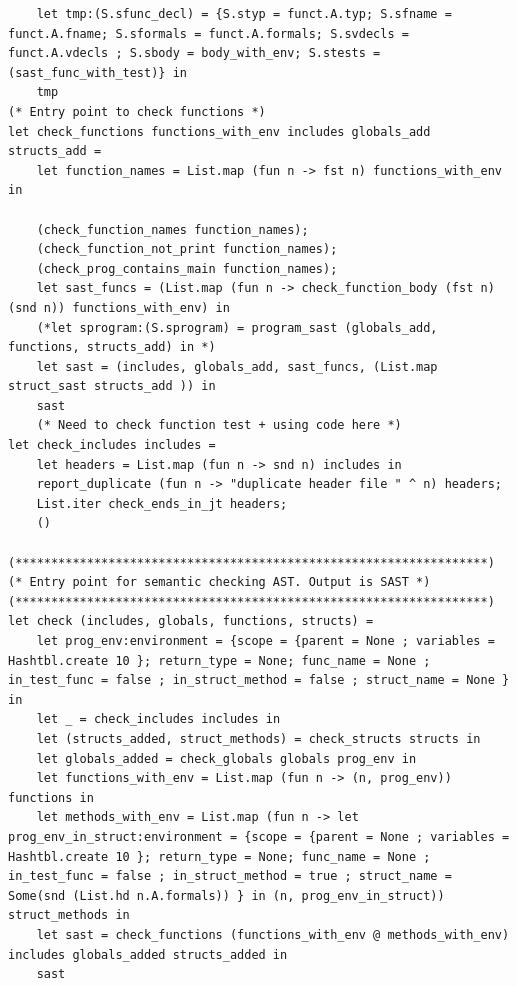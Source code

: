\documentclass{article}
\begin{document}
\begin{lstlisting}
	let tmp:(S.sfunc_decl) = {S.styp = funct.A.typ; S.sfname = funct.A.fname; S.sformals = funct.A.formals; S.svdecls = funct.A.vdecls ; S.sbody = body_with_env; S.stests = (sast_func_with_test)} in
	tmp
(* Entry point to check functions *)
let check_functions functions_with_env includes globals_add structs_add = 
	let function_names = List.map (fun n -> fst n) functions_with_env in 
	
	(check_function_names function_names); 
	(check_function_not_print function_names); 
	(check_prog_contains_main function_names); 
	let sast_funcs = (List.map (fun n -> check_function_body (fst n) (snd n)) functions_with_env) in
	(*let sprogram:(S.sprogram) = program_sast (globals_add, functions, structs_add) in *)
	let sast = (includes, globals_add, sast_funcs, (List.map struct_sast structs_add )) in
	sast
	(* Need to check function test + using code here *)
let check_includes includes = 
	let headers = List.map (fun n -> snd n) includes in
	report_duplicate (fun n -> "duplicate header file " ^ n) headers;
	List.iter check_ends_in_jt headers;
	()
	
(******************************************************************)
(* Entry point for semantic checking AST. Output is SAST *)
(******************************************************************)
let check (includes, globals, functions, structs) =  
	let prog_env:environment = {scope = {parent = None ; variables = Hashtbl.create 10 }; return_type = None; func_name = None ; in_test_func = false ; in_struct_method = false ; struct_name = None } in
	let _ = check_includes includes in
	let (structs_added, struct_methods) = check_structs structs in
	let globals_added = check_globals globals prog_env in
	let functions_with_env = List.map (fun n -> (n, prog_env)) functions in
	let methods_with_env = List.map (fun n -> let prog_env_in_struct:environment = {scope = {parent = None ; variables = Hashtbl.create 10 }; return_type = None; func_name = None ; in_test_func = false ; in_struct_method = true ; struct_name = Some(snd (List.hd n.A.formals)) } in (n, prog_env_in_struct)) struct_methods in
	let sast = check_functions (functions_with_env @ methods_with_env) includes globals_added structs_added in
	sast
\end{lstlisting}
\newpage
\end{document}
